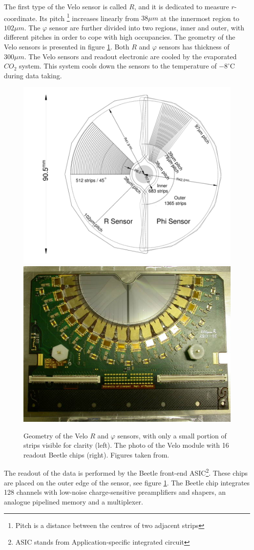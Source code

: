 The first type of the Velo sensor is called $R$, and it is dedicated to measure $r$-coordinate. Its pitch \footnote{Pitch is a distance between the centres of two adjacent strips} increases linearly from $38\mu m$ at the innermost region to $102 \mu m$. The  $\varphi$ sensor are further divided into two regions, inner and outer, with different pitches in order to cope with high occupancies. The geometry of the Velo sensors is presented in figure \ref{fig:velo}. Both $R$ and $\varphi$ sensors has thickness of $300 \mu m$. The Velo sensors and readout electronic are cooled by the evaporated $CO_2$ system. This system cools down the sensors to the temperature of $-8^\circ$C during data taking.  


\begin{figure}[h]
 \begin{center}
  \includegraphics[width=0.49\linewidth]{figures/VeloGeometry.PNG}
   \includegraphics[width=0.49\linewidth]{figures/Velo_photo.jpg}
   \caption{Geometry of the Velo $R$ and  $\varphi$ sensors, with only a small portion of strips visible for clarity (left). The photo of the Velo module with 16 readout Beetle chips (right). Figures taken from\cite{lhcb}.  
     \label{fig:velo}}
 \end{center}
\end{figure}

The readout of the data is performed by the Beetle front-end ASIC\footnote{ASIC stands from Application-specific integrated circuit}\cite{beetle}. These chips are placed on the outer edge of the sensor, see figure \ref{fig:velo}. The Beetle chip integrates 128 channels with low-noise charge-sensitive preamplifiers and shapers, an analogue pipelined memory and a multiplexer.


